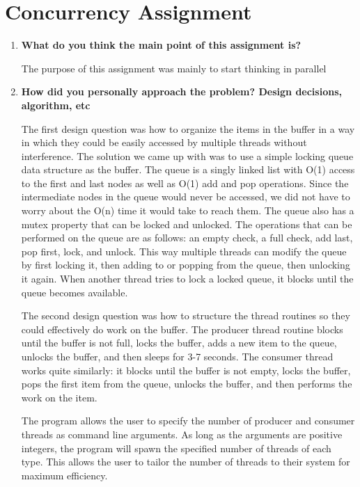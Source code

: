 \documentclass[letterpaper,10pt,titlepage,draftclsnofoot,onecolumn]{IEEEtran}
\begin{document}
\section{Concurrency Assignment}
\begin{enumerate}
\item \textbf{What do you think the main point of this assignment is?}

The purpose of this assignment was mainly to start thinking in parallel \par

\item \textbf{How did you personally approach the problem? Design decisions, algorithm, etc}

  The first design question was how to organize the items in the buffer in a way in which they could be easily accessed by multiple threads without interference. The solution we came up with was to use a simple locking queue data structure as the buffer. The queue is a singly linked list with O(1) access to the first and last nodes as well as O(1) add and pop operations. Since the intermediate nodes in the queue would never be accessed, we did not have to worry about the O(n) time it would take to reach them. The queue also has a mutex property that can be locked and unlocked. The operations that can be performed on the queue are as follows: an empty check, a full check, add last, pop first, lock, and unlock. This way multiple threads can modify the queue by first locking it, then adding to or popping from the queue, then unlocking it again. When another thread tries to lock a locked queue, it blocks until the queue becomes available. \par
  The second design question was how to structure the thread routines so they could effectively do work on the buffer. The producer thread routine blocks until the buffer is not full, locks the buffer, adds a new item to the queue, unlocks the buffer, and then sleeps for 3-7 seconds. The consumer thread works quite similarly: it blocks until the buffer is not empty, locks the buffer, pops the first item from the queue, unlocks the buffer, and then performs the work on the item. \par
  The program allows the user to specify the number of producer and consumer threads as command line arguments. As long as the arguments are positive integers, the program will spawn the specified number of threads of each type. This allows the user to tailor the number of threads to their system for maximum efficiency. \par


\end{enumerate}
\end{document}
